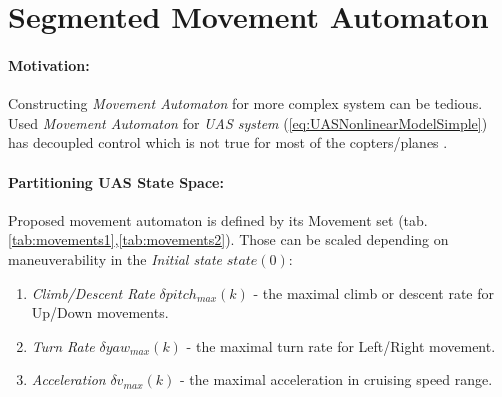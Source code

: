 \section{Segmented Movement Automaton}\label{s:segmentedMovementAutomaton}
\paragraph{Motivation:} Constructing \emph{Movement Automaton} for more complex system can be tedious. Used \emph{Movement Automaton} for \emph{UAS system} (\ref{eq:UASNonlinearModelSimple}) has decoupled control which is not true for most of the copters/planes \cite{fossen2011mathematical}.

\paragraph{Partitioning UAS State Space:} Proposed movement automaton is defined by its Movement set (tab. \ref{tab:movements1},\ref{tab:movements2}). Those can be scaled depending on maneuverability in the  \emph{Initial state} $state(0)$:
\begin{enumerate}
    \item \emph{Climb/Descent Rate} $\delta pitch_{max}(k)$ - the maximal climb or descent rate for Up/Down movements.
    \item \emph{Turn Rate} $\delta yaw_{max}(k)$ - the maximal turn rate for Left/Right movement.
    \item \emph{Acceleration} $\delta v_{max}(k)$ - the maximal acceleration in cruising speed range.
\end{enumerate}

